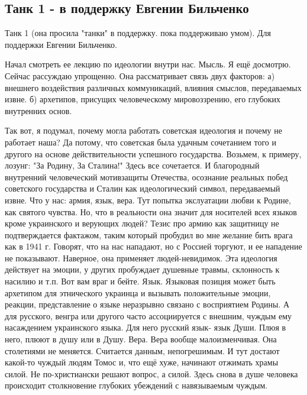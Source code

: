  
 
 
 
 
\subsection{Танк 1 - в поддержку Евгении Бильченко}

Танк 1 (она просила "танки" в поддержку. пока поддерживаю умом). Для  поддержки
Евгении Бильченко. 

Начал смотреть ее лекцию по идеологии внутри нас. Мысль. Я ещё досмотрю. Сейчас
рассуждаю упрощенно. Она рассматривает связь двух факторов: а) внешнего
воздействия различных коммуникаций, влияния смыслов, передаваемых извне. б)
архетипов, присущих человеческому мировоззрению, его глубоких внутренних основ.

Так вот, я подумал, почему могла работать советская идеология  и почему не
работает наша? Да потому, что советская была удачным сочетанием того и другого
на основе действительности успешного государства. Возьмем, к примеру, лозунг:
"За Родину, За Сталина!" Здесь все сочетается. И благородный внутренний
человеческий мотивзащиты Отечества, осознание реальных побед советского
государства и Сталин как идеологический символ, передаваемый извне. Что  у нас:
армия, язык, вера. Тут попытка экслуатации любви к Родине, как святого чувства.
Но, что в реальности она значит для носителей всех языков кроме украинского и
верующих людей? Тезис про армию как защитницу не подтверждается фактажом, таким
который пробудил во мне желание бить врага как в 1941 г. Говорят, что на нас
нападают, но с Россией торгуют, и ее нападение не показывают. Наверное, она
применяет людей-невидимок.  Эта идеология действует на эмоции, у других
пробуждает душевные травмы, склонность к насилию и т.п. Вот вам враг и бейте.
Язык. Языковая позиция может быть архетипом для этнического украинца и вызывать
положительные эмоции, реакции, представление о языке неразрывно связано с
восприятием Родины. А для русского, венгра или другого часто  ассоциируется с
внешним, чуждым ему насаждением украинского языка. Для него русский язык- язык
Души. Плюя в него, плюют в душу или в Душу.   Вера. Вера вообще малоизменчивая.
Она столетиями не меняется. Считается данным, непогрешимым. И тут достают
какой-то чуждый людям Томос и, что ещё хуже, начинают отжимать храмы силой. Не
по-христиански решают вопрос, а силой. Здесь снова в душе человека происходит
столкновение глубоких убеждений с навязываемым чуждым.
